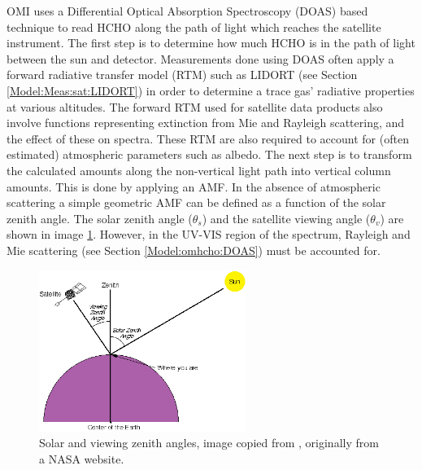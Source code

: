   OMI uses a Differential Optical Absorption Spectroscopy (DOAS) based technique to read HCHO along the path of light which reaches the satellite instrument.
  The first step is to determine how much HCHO is in the path of light between the sun and detector.
  Measurements done using DOAS often apply a forward radiative transfer model (RTM) such as LIDORT (see Section \ref{Model:Meas:sat:LIDORT}) in order to determine a trace gas' radiative properties at various altitudes.
  The forward RTM used for satellite data products also involve functions representing extinction from Mie and Rayleigh scattering, and the effect of these on spectra.
  These RTM are also required to account for (often estimated) atmospheric parameters such as albedo.
  The next step is to transform the calculated amounts along the non-vertical light path into vertical column amounts.
  This is done by applying an AMF.
  In the absence of atmospheric scattering a simple geometric AMF can be defined as a function of the solar zenith angle. 
  The solar zenith angle ($\theta_s$) and the satellite viewing angle ($\theta_v$) are shown in image \ref{ch_HCHO:fig:zenithangle}.
  However, in the UV-VIS region of the spectrum, Rayleigh and Mie scattering (see Section \ref{Model:omhcho:DOAS}) must be accounted for.
  
  
  \begin{figure}\begin{center}
      \includegraphics[width=0.6\textwidth]{Figures/ZenithAngles.png}
      \caption{Solar and viewing zenith angles, image copied from \textcite{SZA_Image}, originally from a NASA website.}
      \label{ch_HCHO:fig:zenithangle}
    \end{center}\end{figure}
  
